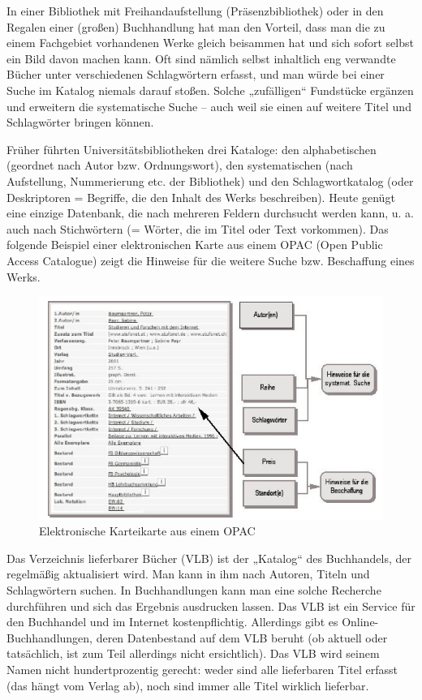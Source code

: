 \documentclass[]{book}
\theoremstyle{definition}
\theoremstyle{definition}
\theoremstyle{definition}
\theoremstyle{remark}
\begin{document}
In einer Bibliothek mit Freihandaufstellung (Präsenzbibliothek) oder in
den Regalen einer (großen) Buchhandlung hat man den Vorteil, dass man
die zu einem Fachgebiet vorhandenen Werke gleich beisammen hat und sich
sofort selbst ein Bild davon machen kann. Oft sind nämlich selbst
inhaltlich eng verwandte Bücher unter verschiedenen Schlagwörtern
erfasst, und man würde bei einer Suche im Katalog niemals darauf stoßen.
Solche „zufälligen`` Fundstücke ergänzen und erweitern die systematische
Suche -- auch weil sie einen auf weitere Titel und Schlagwörter bringen
können.

Früher führten Universitätsbibliotheken drei Kataloge: den
alphabetischen (geordnet nach Autor bzw. Ordnungswort), den
systematischen (nach Aufstellung, Nummerierung etc. der Bibliothek) und
den Schlagwortkatalog (oder Deskriptoren = Begriffe, die den Inhalt des
Werks beschreiben). Heute genügt eine einzige Datenbank, die nach
mehreren Feldern durchsucht werden kann, u. a. auch nach Stichwörtern (=
Wörter, die im Titel oder Text vorkommen). Das folgende Beispiel einer
elektronischen Karte aus einem OPAC (Open Public Access Catalogue) zeigt
die Hinweise für die weitere Suche bzw. Beschaffung eines Werks.

\begin{figure}

{\centering \includegraphics{images/recherchieren-OPAC-Karteikarte-min} 

}

\caption{Elektronische Karteikarte aus einem OPAC}\label{fig:unnamed-chunk-7}
\end{figure}

Das Verzeichnis lieferbarer Bücher (VLB) ist der „Katalog`` des
Buchhandels, der regelmäßig aktualisiert wird. Man kann in ihm nach
Autoren, Titeln und Schlagwörtern suchen. In Buchhandlungen kann man
eine solche Recherche durchführen und sich das Ergebnis ausdrucken
lassen. Das VLB ist ein Service für den Buchhandel und im Internet
kostenpflichtig. Allerdings gibt es Online-Buchhandlungen, deren
Datenbestand auf dem VLB beruht (ob aktuell oder tatsächlich, ist zum
Teil allerdings nicht ersichtlich). Das VLB wird seinem Namen nicht
hundertprozentig gerecht: weder sind alle lieferbaren Titel erfasst (das
hängt vom Verlag ab), noch sind immer alle Titel wirklich lieferbar.
\end{document}

